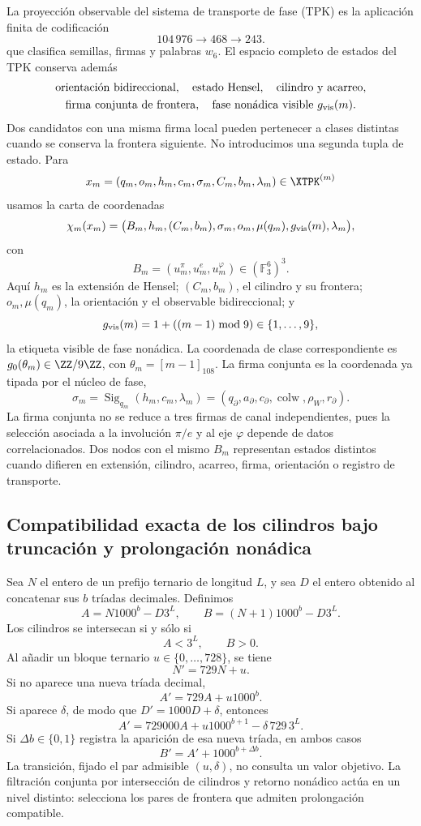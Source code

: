 La proyección observable del sistema de transporte de fase (TPK) es la
aplicación finita de codificación
\[
104\,976\longrightarrow468\longrightarrow243.
\]
que clasifica semillas, firmas y palabras \(w_6\). El espacio completo de
estados del TPK conserva además
\[
\begin{gathered}
\text{orientación bidireccional},\quad
\text{estado Hensel},\quad
\text{cilindro y acarreo},\\
\text{firma conjunta de frontera},\quad
\text{fase nonádica visible }g_{\rm vis}(m).
\end{gathered}
\]
Dos candidatos con una misma firma local pueden pertenecer a clases distintas
cuando se conserva la frontera siguiente. No introducimos una segunda tupla
de estado. Para
\[
x_m=(q_m,o_m,h_m,c_m,\sigma_m,C_m,b_m,\lambda_m)\in\XTPK^{(m)}
\]
usamos la carta de coordenadas
\[
\chi_m(x_m)=
\bigl(
B_m,h_m,(C_m,b_m),\sigma_m,
o_m,\mu(q_m),g_{\rm vis}(m),\lambda_m
\bigr),
\]
con
\[
B_m=(u_m^\pi,u_m^e,u_m^\varphi)\in(\mathbb F_3^6)^3.
\]
Aquí \(h_m\) es la extensión de Hensel; \((C_m,b_m)\), el cilindro y su
frontera; \(o_m,\mu(q_m)\), la orientación y el observable bidireccional; y
\[
g_{\rm vis}(m)=1+((m-1)\bmod9)\in\{1,\ldots,9\},
\]
la etiqueta visible de fase nonádica. La coordenada de clase correspondiente
es \(g_0(\theta_m)\in\ZZ/9\ZZ\), con \(\theta_m=[m-1]_{108}\). La firma conjunta
es la coordenada ya tipada por el núcleo de fase,
\[
\sigma_m=\operatorname{Sig}_{q_m}(h_m,c_m,\lambda_m)
=(q_\partial,a_\partial,c_\partial,
\operatorname{colw},\rho_W,r_\partial).
\]
La firma conjunta no se reduce a tres firmas de canal independientes, pues la
selección asociada a la involución \(\pi/e\) y al eje \(\varphi\) depende de
datos correlacionados. Dos nodos con el mismo \(B_m\) representan estados
distintos cuando difieren en extensión, cilindro, acarreo, firma, orientación
o registro de transporte.

\subsection{Compatibilidad exacta de los cilindros bajo truncación y prolongación nonádica}

Sea \(N\) el entero de un prefijo ternario de longitud \(L\), y sea \(D\)
el entero obtenido al concatenar sus \(b\) tríadas decimales. Definimos
\[
A=N1000^b-D3^L,
\qquad
B=(N+1)1000^b-D3^L.
\]
Los cilindros se intersecan si y sólo si
\[
\boxed{A<3^L,\qquad B>0.}
\]
Al añadir un bloque ternario \(u\in\{0,\ldots,728\}\), se tiene
\[
N'=729N+u.
\]
Si no aparece una nueva tríada decimal,
\[
A'=729A+u1000^b.
\]
Si aparece \(\delta\), de modo que \(D'=1000D+\delta\), entonces
\[
A'=729000A+u1000^{b+1}-\delta\,729\,3^L.
\]
Si \(\Delta b\in\{0,1\}\) registra la aparición de esa nueva tríada, en
ambos casos
\[
B'=A'+1000^{b+\Delta b}.
\]
La transición, fijado el par admisible \((u,\delta)\), no consulta un valor
objetivo. La filtración conjunta por intersección de cilindros y retorno
nonádico actúa en un nivel distinto: selecciona los pares de frontera que
admiten prolongación compatible.

